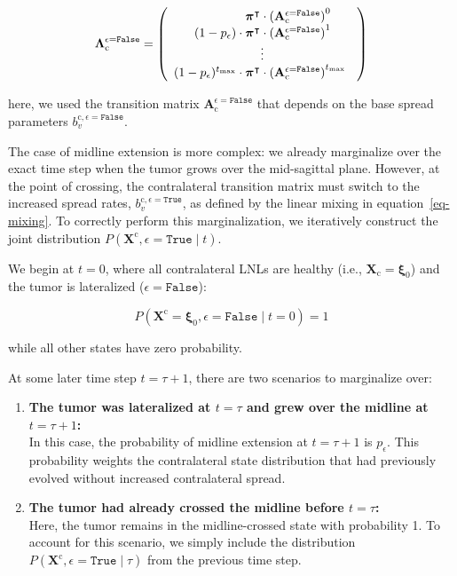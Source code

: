 \documentclass[
  sn-mathphys-num,
]{sn-jnl}
\begin{document}
\[
\boldsymbol{\Lambda}_\text{c}^{\epsilon=\texttt{False}} =
\left(
\begin{array}{r}
\boldsymbol{\pi}^\intercal \cdot \left( \mathbf{A}_\text{c}^{\epsilon=\texttt{False}} \right)^{0\phantom{t_\text{max}}} \\
(1-p_\epsilon) \cdot \boldsymbol{\pi}^\intercal \cdot \left( \mathbf{A}_\text{c}^{\epsilon=\texttt{False}} \right)^{1\phantom{t_\text{max}}} \\
\hfill \vdots \hfill \\
(1-p_\epsilon)^{t_\text{max}} \cdot \boldsymbol{\pi}^\intercal \cdot \left( \mathbf{A}_\text{c}^{\epsilon=\texttt{False}} \right)^{t_\text{max}\phantom{0}} \\
\end{array}
\right)
\]

here, we used the transition matrix
\(\mathbf{A}_\text{c}^{\epsilon=\texttt{False}}\) that depends on the
base spread parameters \(b_v^{\text{c},\epsilon=\texttt{False}}\).

The case of midline extension is more complex: we already marginalize
over the exact time step when the tumor grows over the mid-sagittal
plane. However, at the point of crossing, the contralateral transition
matrix must switch to the increased spread rates,
\(b_v^{\text{c}, \epsilon=\texttt{True}}\), as defined by the linear
mixing in equation~\ref{eq-mixing}. To correctly perform this
marginalization, we iteratively construct the joint distribution
\(P \left( \mathbf{X}^\text{c}, \epsilon=\texttt{True} \mid t \right)\).

We begin at \(t=0\), where all contralateral LNLs are healthy (i.e.,
\(\mathbf{X}_\text{c}=\boldsymbol{\xi}_0\)) and the tumor is lateralized
(\(\epsilon=\texttt{False}\)):

\[
P \left( \mathbf{X}^\text{c} = \boldsymbol{\xi}_0, \epsilon=\texttt{False} \mid t=0 \right) = 1
\]

while all other states have zero probability.

At some later time step \(t=\tau+1\), there are two scenarios to
marginalize over:

\begin{enumerate}
\def\labelenumi{\arabic{enumi}.}
\item
  \textbf{The tumor was lateralized at \(t=\tau\) and grew over the
  midline at \(t=\tau+1\):}\\
  In this case, the probability of midline extension at \(t=\tau+1\) is
  \(p_\epsilon\). This probability weights the contralateral state
  distribution that had previously evolved without increased
  contralateral spread.
\item
  \textbf{The tumor had already crossed the midline before
  \(t=\tau\):}\\
  Here, the tumor remains in the midline-crossed state with probability
  1. To account for this scenario, we simply include the distribution
  \(P\left( \mathbf{X}^\text{c}, \epsilon=\texttt{True} \mid \tau \right)\)
  from the previous time step.
\end{enumerate}
\end{document}
